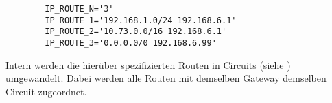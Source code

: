 \begin{description}
    \begin{example}
    \begin{verbatim}
        IP_ROUTE_N='3'
        IP_ROUTE_1='192.168.1.0/24 192.168.6.1'
        IP_ROUTE_2='10.73.0.0/16 192.168.6.1'
        IP_ROUTE_3='0.0.0.0/0 192.168.6.99'
    \end{verbatim}
    \end{example}

    Intern werden die hierüber spezifizierten Routen in Circuits (siehe
    ) umgewandelt. Dabei
    werden alle Routen mit demselben Gateway demselben Circuit zugeordnet.
  \end{description}
